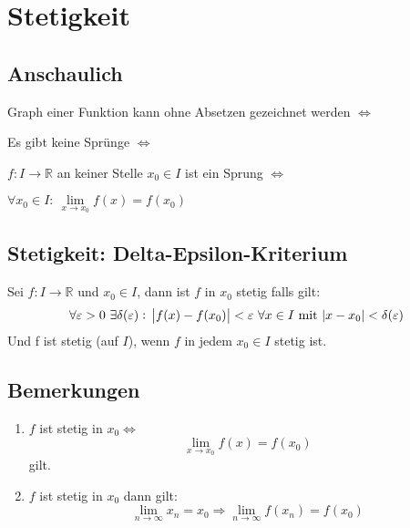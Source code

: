 \documentclass[10pt]{article}
\newcommand{\R}{\mathbb{R}}
\begin{document}
    \section{Stetigkeit}

    \subsection{Anschaulich}
    Graph einer Funktion kann ohne Absetzen gezeichnet werden $\Leftrightarrow$

    Es gibt keine Sprünge $\Leftrightarrow$

    $f: I \rightarrow \R$ an keiner Stelle $x_0 \in I$ ist ein Sprung $\Leftrightarrow$

    $\forall x_0 \in I:\ \lim\limits_{x \rightarrow x_0} f(x) = f(x_0)$


    \subsection{Stetigkeit: Delta-Epsilon-Kriterium}
    Sei $f: I \rightarrow \R$ und $x_0 \in I$, dann ist $f$ in $x_0$ stetig
    falls gilt:
    \begin{equation*}
        \forall \varepsilon > 0\ \exists \delta(\varepsilon):\
        \abs{f(x)-f(x_0)}<\varepsilon\ \forall x \in I \text{ mit }
        \abs{x-x_0}<\delta(\varepsilon)
    \end{equation*}
    Und f ist stetig (auf $I$), wenn $f$ in jedem $x_0 \in I$ stetig ist.

    \subsection{Bemerkungen}
    \begin{enumerate}[label= (\alph*)]
        \item $f$ ist stetig in $x_0 \Leftrightarrow$
            \begin{equation*}
                \lim_{x \rightarrow x_0} f(x) = f(x_0)
            \end{equation*}
            gilt.
        \item $f$ ist stetig in $x_0$ dann gilt:
            \begin{equation*}
                \lim_{n \rightarrow \infty} x_n = x_0 \Rightarrow
                \lim_{n \rightarrow \infty} f(x_n) = f(x_0)
            \end{equation*}
    \end{enumerate}
\end{document}
